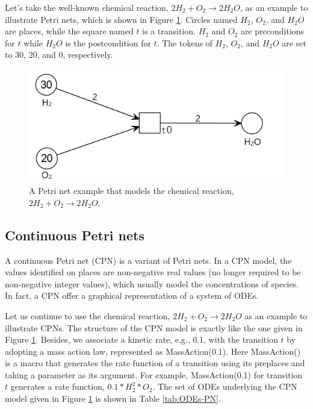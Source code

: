 \documentclass[journal,a4paper,onecolumn]{article}
\begin{document}
Let's take the well-known chemical reaction, $2H_2+O_2\to 2H_2O$, as an example \cite{Mur89} to illustrate Petri nets, which is shown in Figure \ref{fig:PNexample}. Circles named $H_2$, $O_2$, and $H_2O$ are places, while the square named $t$ is a transition. 
$H_2$ and $O_2$ are preconditions for $t$ while $H_2O$ is the postcondition for $t$. The tokens of $H_2$, $O_2$, and $H_2O$ are set to 30, 20, and 0, respectively. 

\begin{figure}[!hbt]
	\begin{center}
		\includegraphics[width=0.5\columnwidth]{fig47}
		\caption{A Petri net example that models the chemical reaction, $2H_2+O_2\to 2H_2O$.}
		\label{fig:PNexample}
	\end{center}
\end{figure}



\subsection{Continuous Petri nets}

A continuous Petri net (CPN) \cite{BGH+08} is a variant of Petri nets. In a CPN model, the values identified on places are non-negative real values (no longer required to be non-negative integer values), which usually model the concentrations of species.
In fact, a CPN offer a graphical representation of a system of ODEs.

Let us continue to use the chemical reaction, $2H_2+O_2\to 2H_2O$ as an example to illustrate CPNs. The structure of the CPN model is exactly like the one given in Figure \ref{fig:PNexample}. Besides, we associate a kinetic rate, e.g., 0.1, with the transition $t$ by adopting a mass action law, represented as MassAction(0.1).
Here MassAction() is a macro that generates the rate function of a transition using its preplaces and taking a parameter as its argument. For example, MassAction(0.1) for transition $t$ generates a rate function, $0.1*H_2^{2}*O_2$. 
The set of ODEs underlying the CPN model given in Figure \ref{fig:PNexample} is shown in Table \ref{tab:ODEs-PN}.
\end{document}

